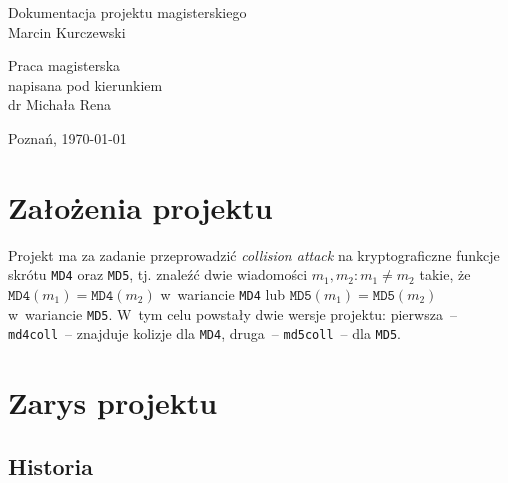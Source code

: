 \documentclass[12pt,a4paper,twoside]{article}
\begin{document}
\newcommand{\en}[1]{\textit{\enn{#1}}}
\newcommand{\enn}[1]{\foreignlanguage{english}{#1}}

\begin{titlepage}
    \begin{center}

    \vspace{1cm}
    {\Huge Dokumentacja projektu magisterskiego} \\[0.5cm]
    {\Large Marcin Kurczewski}
    \end{center}

    \vspace{3cm}
    \hspace{8cm}\parbox[l]{6cm}{\Large Praca magisterska \\
    napisana pod kierunkiem \\
    dr Michała Rena}

    \begin{center}
    \vspace{4cm}
    Poznań, \today
    \end{center}
\end{titlepage}

\section{Założenia projektu}

Projekt ma za zadanie przeprowadzić \en{collision attack} na kryptograficzne
funkcje skrótu \texttt{MD4} oraz \texttt{MD5}, tj. znaleźć dwie wiadomości
$m_1, m_2 : m_1 \neq m_2$ takie, że $\mathtt{MD4}(m_1) = \mathtt{MD4}(m_2)$
w~wariancie \texttt{MD4} lub $\mathtt{MD5}(m_1) = \mathtt{MD5}(m_2)$
w~wariancie \texttt{MD5}. W~tym celu powstały dwie wersje projektu: pierwsza~--
\texttt{md4coll}~-- znajduje kolizje dla \texttt{MD4}, druga~--
\texttt{md5coll}~-- dla \texttt{MD5}.

\section{Zarys projektu}

\subsection{Historia}
\end{document}

